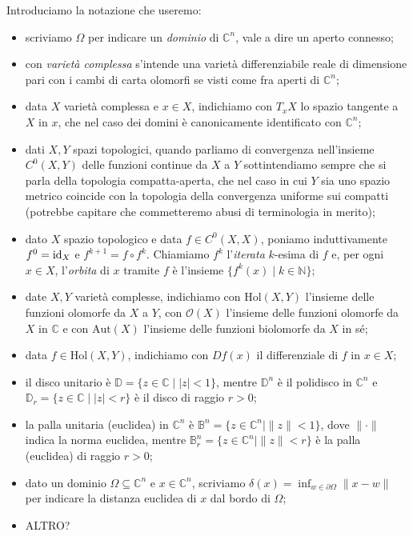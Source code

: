 Introduciamo la notazione che useremo:
\begin{itemize}
    \item scriviamo $\Omega$ per indicare un \textit{dominio} di $\mathbb{C}^n$, vale a dire un aperto connesso;
    \item con \textit{varietà complessa} s'intende una varietà differenziabile reale di dimensione pari con i cambi di carta olomorfi se visti come fra aperti di $\mathbb{C}^n$;
    \item data $X$ varietà complessa e $x \in X$, indichiamo con $T_xX$ lo spazio tangente a $X$ in $x$, che nel caso dei domini è canonicamente identificato con $\mathbb{C}^n$;
    \item dati $X,Y$ spazi topologici, quando parliamo di convergenza nell'insieme $C^0(X,Y)$ delle funzioni continue da $X$ a $Y$ sottintendiamo sempre che si parla della topologia compatta-aperta, che nel caso in cui $Y$ sia uno spazio metrico coincide con la topologia della convergenza uniforme sui compatti (potrebbe capitare che commetteremo abusi di terminologia in merito);
    \item dato $X$ spazio topologico e data $f \in C^0(X,X)$, poniamo induttivamente $f^0=\operatorname{id}_X$ e $f^{k+1}=f\circ f^k$. Chiamiamo $f^k$ l'\textit{iterata} $k$-esima di $f$ e, per ogni $x \in X$, l'\textit{orbita} di $x$ tramite $f$ è l'insieme $\{f^k(x)\mid k \in \mathbb{N}\}$;
    \item date $X,Y$ varietà complesse, indichiamo con $\text{Hol}(X,Y)$ l'insieme delle funzioni olomorfe da $X$ a $Y$, con $\mathcal{O}(X)$ l'insieme delle funzioni olomorfe da $X$ in $\mathbb{C}$ e con $\text{Aut}(X)$ l'insieme delle funzioni biolomorfe da $X$ in sé;
    \item data $f \in \text{Hol}(X,Y)$, indichiamo con $Df(x)$ il differenziale di $f$ in $x \in X$;
    \item il disco unitario è $\mathbb{D}=\{z \in \mathbb{C} \mid |z|<1\}$, mentre $\mathbb{D}^n$ è il polidisco in $\mathbb{C}^n$ e $\mathbb{D}_r=\{z \in \mathbb{C} \mid |z|<r\}$ è il disco di raggio $r>0$;
    \item la palla unitaria (euclidea) in $\mathbb{C}^n$ è $\mathbb{B}^n=\{z \in \mathbb{C}^n \mid \|z\|<1\}$, dove $\|\cdot\|$ indica la norma euclidea, mentre $\mathbb{B}_r^n=\{z \in \mathbb{C}^n \mid \|z\|<r\}$ è la palla (euclidea) di raggio $r>0$;
    \item dato un dominio $\Omega\subseteq\mathbb{C}^n$ e $x \in \mathbb{C}^n$, scriviamo $\delta(x)=\displaystyle\inf_{w \in \partial\Omega}\|x-w\|$ per indicare la distanza euclidea di $x$ dal bordo di $\Omega$;
    \item ALTRO?
\end{itemize}

